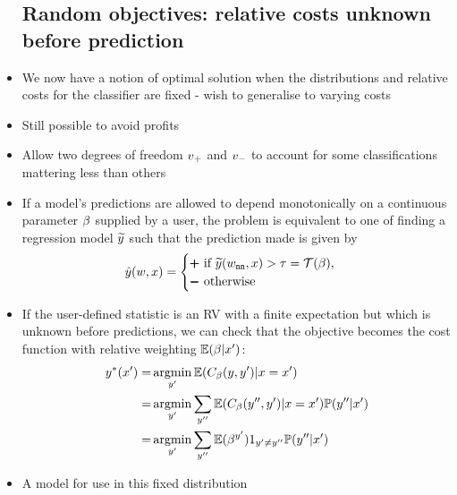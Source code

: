 \documentclass{article}
\begin{document}
\begin{itemize}
          \subsection{Random objectives: relative costs unknown before prediction}
        \item
          We now have a notion of optimal solution when the distributions and relative costs for the classifier are fixed - wish to generalise to varying costs
        \item
          Still possible to avoid profits
        \item
          Allow two degrees of freedom ${{v}_+}$ and ${{v}_-}$ to account for some classifications mattering less than others
        \item
          If a model's predictions are allowed to depend monotonically on a continuous parameter ${{\beta}}$ supplied by a user, the problem is equivalent to one of finding a regression model $\widetilde{y}$ such that the prediction made is given by
          $$
          {\hat{y}}(w,x)=\begin{cases}\pmb+\text{ if }\widetilde{y}(w_{\texttt{nn}},x)>\tau=\mathcal T({{\beta}}),\\\pmb-\text{ otherwise}\end{cases}
          $$
        \item
          If the user-defined statistic is an RV with a finite expectation but which is unknown before predictions, we can check that the objective becomes the cost function with relative weighting $\mathbb E(\RELCOST|\FeatD)$:
        \begin{align*}
          \PredB(\FeatD)=&\argmin_{\TargD}\mathbb E(\SCORE_{\RELCOST}(\targ,\TargD)|\Feat=\FeatD)\\
          =&\argmin_{\TargD}\sum_{\TargDD}\mathbb E(\SCORE_{\RELCOST}(\TargDD,\TargD)|\Feat=\FeatD)\mathbb P(\TargDD|\FeatD)\\
          =&\argmin_{\TargD}\sum_{\TargDD}\mathbb E(\RELCOST^{\TargD})1_{\TargD\neq\TargDD}\mathbb P(\TargDD|\FeatD)
        \end{align*}
        \item
          A model for use in this fixed distribution

\end{itemize}
\end{document}
